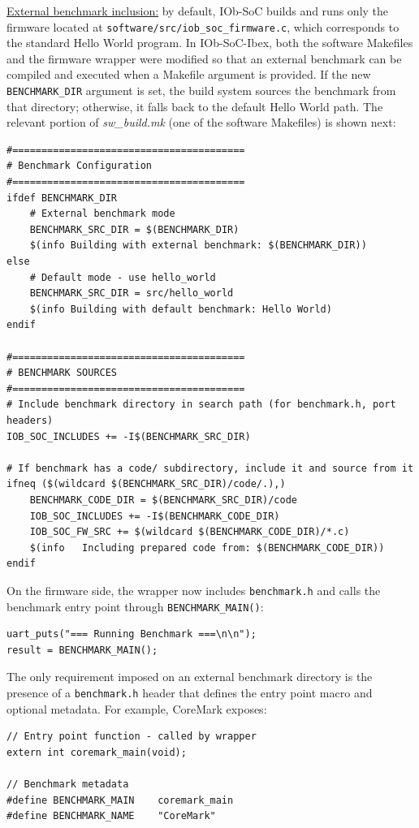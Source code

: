  \underline{External benchmark inclusion:} by default, IOb-SoC \cite{iob-soc} builds and runs only the firmware located at \texttt{software/src/iob\_soc\_firmware.c}, which corresponds to the standard Hello World program. In IOb-SoC-Ibex, both the software Makefiles and the firmware wrapper were modified so that an external benchmark can be compiled and executed when a Makefile argument is provided. If the new \texttt{BENCHMARK\_DIR} argument is set, the build system sources the benchmark from that directory; otherwise, it falls back to the default Hello World path. The relevant portion of \textit{sw\_build.mk} (one of the software Makefiles) is shown next:
\begin{lstlisting}[language=matlabfloz,caption={Portion of the new sw\_build.mk}]
#========================================
# Benchmark Configuration
#========================================
ifdef BENCHMARK_DIR
    # External benchmark mode
    BENCHMARK_SRC_DIR = $(BENCHMARK_DIR)
    $(info Building with external benchmark: $(BENCHMARK_DIR))
else
    # Default mode - use hello_world
    BENCHMARK_SRC_DIR = src/hello_world
    $(info Building with default benchmark: Hello World)
endif

#========================================
# BENCHMARK SOURCES
#========================================
# Include benchmark directory in search path (for benchmark.h, port headers)
IOB_SOC_INCLUDES += -I$(BENCHMARK_SRC_DIR)

# If benchmark has a code/ subdirectory, include it and source from it
ifneq ($(wildcard $(BENCHMARK_SRC_DIR)/code/.),)
    BENCHMARK_CODE_DIR = $(BENCHMARK_SRC_DIR)/code
    IOB_SOC_INCLUDES += -I$(BENCHMARK_CODE_DIR)
    IOB_SOC_FW_SRC += $(wildcard $(BENCHMARK_CODE_DIR)/*.c)
    $(info   Including prepared code from: $(BENCHMARK_CODE_DIR))
endif
\end{lstlisting}

 On the firmware side, the wrapper now includes \texttt{benchmark.h} and calls the benchmark entry point through \texttt{BENCHMARK\_MAIN()}:
\begin{lstlisting}[language=matlabfloz,caption={Portion of the new iob\_soc\_firmware.c}]
uart_puts("=== Running Benchmark ===\n\n");
result = BENCHMARK_MAIN();
\end{lstlisting}

 The only requirement imposed on an external benchmark directory is the presence of a \texttt{benchmark.h} header that defines the entry point macro and optional metadata. For example, CoreMark exposes:
\begin{lstlisting}[language=matlabfloz,caption={Portion of Coremark's benchmark.h}]
// Entry point function - called by wrapper
extern int coremark_main(void);

// Benchmark metadata
#define BENCHMARK_MAIN    coremark_main
#define BENCHMARK_NAME    "CoreMark"
\end{lstlisting}

